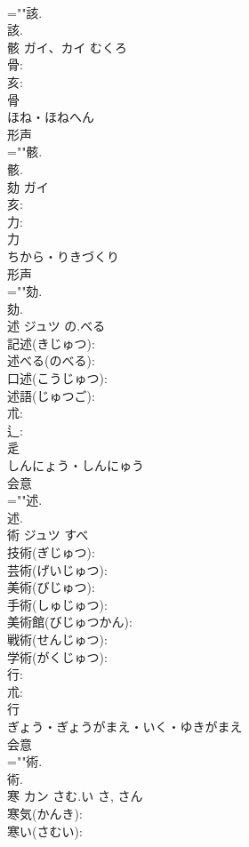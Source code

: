 \documentclass[8pt]{extreport}
\begin{document}
\begin{CJK}{UTF8}{min}
\\	=""該.
\\	該.
\\	骸	ガイ、カイ	むくろ		
\\	骨: 
\\	亥: 
\\	骨	
\\	ほね・ほねへん	
\\	形声 
\\	=""骸.
\\	骸.
\\	劾	ガイ			
\\	亥: 
\\	力: 
\\	力	
\\	ちから・りきづくり	
\\	形声 
\\	=""劾.
\\	劾.
\\	述	ジュツ	の.べる		
\\	記述(きじゅつ): 
\\	述べる(のべる): 
\\	口述(こうじゅつ): 
\\	述語(じゅつご): 
\\	朮: 
\\	辶: 
\\	辵	
\\	しんにょう・しんにゅう	
\\	会意 
\\	=""述.
\\	述.
\\	術	ジュツ	すべ		
\\	技術(ぎじゅつ): 
\\	芸術(げいじゅつ): 
\\	美術(びじゅつ): 
\\	手術(しゅじゅつ): 
\\	美術館(びじゅつかん): 
\\	戦術(せんじゅつ): 
\\	学術(がくじゅつ): 
\\	行: 
\\	朮: 
\\	行	
\\	ぎょう・ぎょうがまえ・いく・ゆきがまえ	
\\	会意 
\\	=""術.
\\	術.
\\	寒	カン	さむ.い	さ, さん	
\\	寒気(かんき): 
\\	寒い(さむい): 

\end{CJK}
\end{document}

